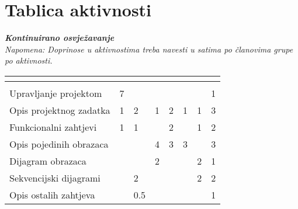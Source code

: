		\eject
		\section*{Tablica aktivnosti}
		
			\textbf{\textit{Kontinuirano osvježavanje}}\\
			
			 \textit{Napomena: Doprinose u aktivnostima treba navesti u satima po članovima grupe po aktivnosti.}
					
						
			
			\begin{longtabu} to \textwidth {|X[7, l]|X[1, c]|X[1, c]|X[1, c]|X[1, c]|X[1, c]|X[1, c]|X[1, c]|}
								
				  &      &  &
				 &	 &	 &
				 &
				 \\ \hline 
				\endfirsthead
				
			
				  &      &  &
				 &	 &	 &
				 &
				 \\ \hline  
				\endhead
				
				
				\endfoot
							
				 
				\endlastfoot
				
				Upravljanje projektom 		&7  &  &  &  &  &  &1   \\ \hline
				Opis projektnog zadatka 	&1  &2  &1  &2  &1  &1  &3   \\ \hline
				
				Funkcionalni zahtjevi       &1  &1  &  &2  &  &1  &2    \\ \hline
				Opis pojedinih obrazaca 	&  &  &4  &3  &3  &  &3    \\ \hline
				Dijagram obrazaca 			&  &  &2  &  &  &2  &1    \\ \hline
				Sekvencijski dijagrami 		&  &2  &  &  &  &2  &2    \\ \hline
				Opis ostalih zahtjeva 		&  &0.5  &  &  &  &  &1    \\ \hline


\end{longtabu}
